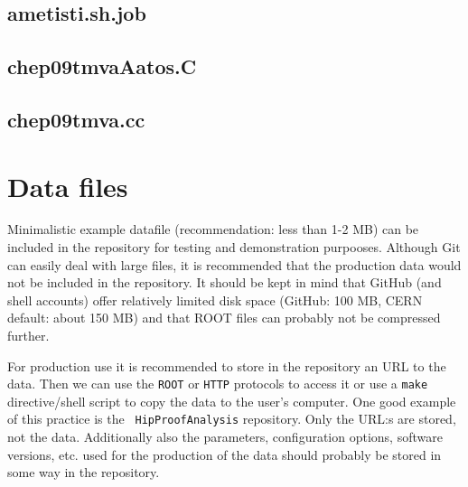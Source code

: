 \begin{appendix}
\subsection{ametisti.sh.job}


\subsection{chep09tmvaAatos.C}


\subsection{chep09tmva.cc}


\section{Data files}
Minimalistic example datafile (recommendation: less than 1-2 MB) can
be included in the repository for testing and demonstration
purpooses. Although Git can easily deal with large files, it is
recommended that the production data would not be
included in the repository. It should be kept in mind that GitHub
(and shell accounts) offer relatively limited disk space (GitHub: 100
MB, CERN default: about 150 MB) and that ROOT files can probably not be
compressed further.

For production use it is recommended to store in the repository an URL
to the data. Then we can use the {\tt ROOT} or {\tt HTTP} protocols to
access it or use a {\tt make} directive/shell script to copy the data to the
user's computer. One good example of this practice is the {\tt
HipProofAnalysis} repository. Only the URL:s are stored, not the
data. Additionally also the parameters, configuration options,
software versions, etc. used for the production of the data should
probably be stored in some way in the repository.


\end{appendix}
